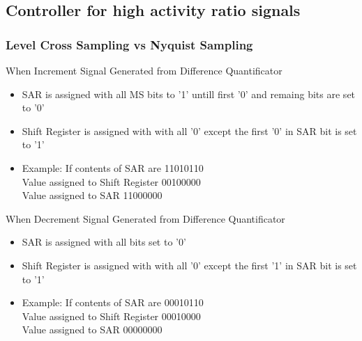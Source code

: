 \subsection*{Controller for high activity ratio signals}
\begin{frame}
	\frametitle{Level Cross Sampling vs Nyquist Sampling} \scriptsize
	\footnotesize{When Increment Signal Generated from Difference Quantificator}
	\begin{center}
		\begin{itemize} \scriptsize
			\item{SAR is assigned with all MS bits to '1' untill first '0' and remaing bits are set to '0'}
			\item{Shift Register is assigned with with all '0' except the first '0' in SAR bit is set to '1'}
			\item{\color{blue}Example: \color{black}If contents of SAR are 11\color{brown}0\color{black}10110 \\ 
			\hspace {1.2 cm} Value assigned to Shift Register 00\color{red}1\color{black}00000 \\ 
			\hspace {1.2 cm} Value assigned to SAR 11000000} \\
		\end{itemize}
	\end{center}
	\footnotesize{When Decrement Signal Generated from Difference Quantificator}
	\begin{center}
		\begin{itemize} \scriptsize
			\item{SAR is assigned with all bits set to '0'}
			\item{Shift Register is assigned with with all '0' except the first '1' in SAR bit is set to '1'}
			\item{\color{blue}Example: \color{black}If contents of SAR are 000\color{brown}1\color{black}0110 \\ 
			\hspace {1.2 cm} Value assigned to Shift Register 000\color{red}1\color{black}0000 \\ 
			\hspace {1.2 cm} Value assigned to SAR 00000000 }
		\end{itemize}
	\end{center}
\end{frame}


